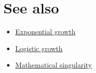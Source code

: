 \documentclass[lang=cn,11pt,a4paper,cite=numbers]{elegantpaper}
\begin{document}
\section{See also}
\begin{itemize}
  \item \href{https://en.wikipedia.org/wiki/Exponential_growth}{Exponential growth}
  \item \href{https://en.wikipedia.org/wiki/Logistic_growth}{Logistic growth}
  \item \href{https://en.wikipedia.org/wiki/Mathematical_singularity}{Mathematical singularity}
\end{itemize}

\nocite{*}

\end{document}
